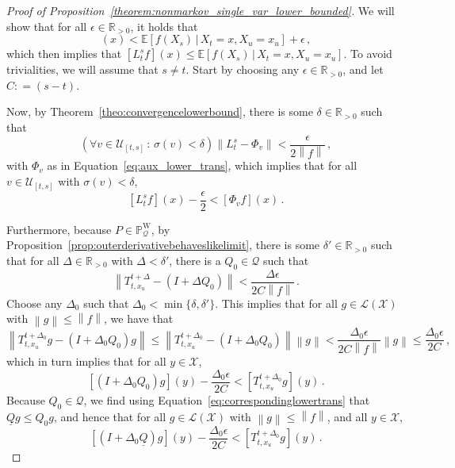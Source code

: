\documentclass[10pt,a4paper]{paper}
\theoremstyle{definition}
\newcommand{\reals}{\mathbb{R}}
\newcommand{\realspos}{\reals_{>0}}
\newcommand{\realsnonneg}{\reals_{\geq 0}}
\newcommand{\states}{\mathcal{X}}
\newcommand{\processes}{\mathbb{P}}
\newcommand{\wprocesses}{\processes^{\mathrm{W}}}
\newcommand{\gambles}{\mathcal{L}}
\newcommand{\gamblesX}{\gambles(\states)}
\newcommand{\rateset}{\mathcal{Q}}
\newcommand{\lrate}{\underline{Q}}
\newcommand{\norm}[1]{\left\lVert #1 \right\rVert}
\newcommand{\coloneqq}{:\!=}
\begin{document}
\begin{proof}[Proof of Proposition~\ref{theorem:nonmarkov_single_var_lower_bounded}]
We will show that for all $\epsilon\in\realspos$, it holds that 
\begin{equation*}
[L_{t}^s f](x) < \mathbb{E}[f(X_s)\,\vert\,X_t=x,X_u=x_u] + \epsilon\,,
\end{equation*}
which then implies that $[L_{t}^s f](x) \leq \mathbb{E}[f(X_s)\,\vert\,X_t=x,X_u=x_u]$. To avoid trivialities, we will assume that $s\neq t$. Start by choosing any $\epsilon\in\realspos$, and let $C\coloneqq(s-t)$. 

Now, by Theorem~\ref{theo:convergencelowerbound}, there is some $\delta\in\realspos$ such that
\begin{equation*}
(\forall v\in\mathcal{U}_{[t,s]}\,:\,\sigma(v)<\delta) \norm{L_{t}^s - \Phi_v} < \frac{\epsilon}{2\norm{f}}\,,
\end{equation*}
with $\Phi_v$ as in Equation~\eqref{eq:aux_lower_trans}, which implies that for all $v\in\mathcal{U}_{[t,s]}$ with $\sigma(v)<\delta$,
\begin{equation}\label{eq:lowerbound_proof_linear_approx_lbound}
\left[L_{t}^sf\right](x) - \frac{\epsilon}{2} < \left[\Phi_vf\right](x)\,.
\end{equation}

Furthermore, because $P\in\wprocesses_\rateset$, by Proposition~\ref{prop:outerderivativebehaveslikelimit}, there is some $\delta'\in\realspos$ such that for all $\Delta\in\realspos$ with $\Delta<\delta'$, there is a $Q_0\in\rateset$ such that
\begin{equation*}
\norm{T_{t,x_u}^{t+\Delta} - (I+\Delta Q_0)} < \frac{\Delta\epsilon}{2C\norm{f}}\,.
\end{equation*}
Choose any $\Delta_0$ such that $\Delta_0<\min\{\delta,\delta'\}$. This implies that for all $g\in\gamblesX$ with $\norm{g}\leq\norm{f}$, we have that
\begin{equation*}
\norm{T_{t,x_u}^{t+\Delta_0}g - (I+\Delta_0 Q_0)g} \leq \norm{T_{t,x_u}^{t+\Delta_0} - (I+\Delta_0 Q_0)}\norm{g} < \frac{\Delta_0\epsilon}{2C\norm{f}}\norm{g} \leq \frac{\Delta_0\epsilon}{2C}\,,
\end{equation*}
which in turn implies that for all $y\in\states$,
\begin{equation*}
\left[(I+\Delta_0 Q_0)g\right](y) - \frac{\Delta_0\epsilon}{2C} < \left[T_{t,x_u}^{t+\Delta_0}g\right](y)\,.
\end{equation*}
Because $Q_0\in\rateset$, we find using Equation~\eqref{eq:correspondinglowertrans} that $\lrate g\leq Q_0g$, and hence that for all $g\in\gamblesX$ with $\norm{g}\leq\norm{f}$, and all $y\in\states$,
\begin{equation}\label{eq:lowerbound_proof_linear_approx_last_part}
\left[(I+\Delta_0 \lrate)g\right](y) - \frac{\Delta_0\epsilon}{2C} < \left[T_{t,x_u}^{t+\Delta_0}g\right](y)\,.
\end{equation}


\end{proof}
\end{document}
